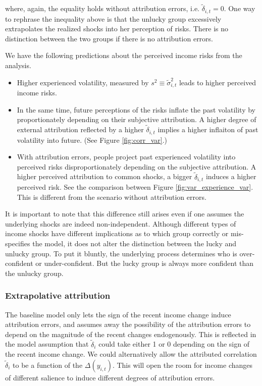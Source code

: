 \documentclass[12pt,notitlepage,onecolumn,aps,pra]{article}
\begin{document}
where, again, the equality holds without attribution errors, i.e.
\(\tilde \delta_{i,t} = 0\). One way to rephrase the inequality above is
that the unlucky group excessively extrapolates the realized shocks into
her perception of risks. There is no distinction between the two groups
if there is no attribution errors.

We have the following predictions about the perceived income risks from
the analysis.

\begin{itemize}
\item
  Higher experienced volatility, measured by
  \(s^2 \equiv \tilde{\sigma}^2_{i,t}\) leads to higher perceived income
  risks.
\item
  In the same time, future perceptions of the risks inflate the past
  volatility by proportionately depending on their subjective
  attribution. A higher degree of external attribution reflected by a
  higher \(\tilde \delta_{i,t}\) implies a higher inflaiton of past
  volatility into future. (See Figure \ref{fig:corr_var}.)
\item
  With attribution errors, people project past experienced volatility
  into perceived risks disproportionately depending on the subjective
  attribution. A higher perceived attribution to common shocks, a bigger
  \(\tilde \delta_{i,t}\) induces a higher perceived risk. See the
  comparison between Figure \ref{fig:var_experience_var}. This is
  different from the scenario without attribution errors.
\end{itemize}

It is important to note that this difference still arises even if one
assumes the underlying shocks are indeed non-independent. Although
different types of income shocks have different implications as to which
group correctly or mis-specifies the model, it does not alter the
distinction between the lucky and unlucky group. To put it bluntly, the
underlying process determines who is over-confident or under-confident.
But the lucky group is always more confident than the unlucky group.


    \hypertarget{extrapolative-attribution}{%
\subsubsection{Extrapolative
attribution}\label{extrapolative-attribution}}

The baseline model only lets the sign of the recent income change induce
attribution errors, and assumes away the possibility of the attribution
errors to depend on the magnitude of the recent changes endogenously.
This is reflected in the model assumption that \(\tilde \delta_i\) could
take either 1 or 0 depending on the sign of the recent income change. We
could alternatively allow the attributed correlation \(\tilde \delta_i\)
to be a function of the \(\Delta(y_{i,t})\). This will open the room for
income changes of different salience to induce different degrees of
attribution errors.
\end{document}
